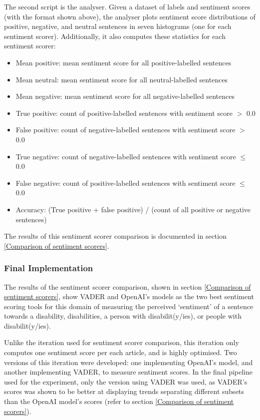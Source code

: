 \documentclass{report}
\begin{document}
The second script is the analyser.
Given a dataset of labels and sentiment scores (with the format shown above), the analyser plots sentiment score distributions of positive, negative, and neutral sentences in seven histograms (one for each sentiment scorer).
Additionally, it also computes these statistics for each sentiment scorer:
\begin{itemize}
	\item Mean positive: mean sentiment score for all positive-labelled sentences
	\item Mean neutral: mean sentiment score for all neutral-labelled sentences
	\item Mean negative: mean sentiment score for all negative-labelled sentences
	\item True positive: count of positive-labelled sentences with sentiment score $>$ 0.0
	\item False positive: count of negative-labelled sentences with sentiment score $>$ 0.0 
	\item True negative: count of negative-labelled sentences with sentiment score $\le$ 0.0
	\item False negative: count of positive-labelled sentences with sentiment score $\le$ 0.0
	\item Accuracy: (True positive + false positive) / (count of all positive or negative sentences)
\end{itemize}
The results of this sentiment scorer comparison is documented in section \ref{Comparison of sentiment scorers}.

\subsubsection{Final Implementation} \label{des-sentiment-final}

The results of the sentiment scorer comparison, shown in section \ref{Comparison of sentiment scorers}, show VADER \cite{VADER} and OpenAI's \cite{OpenAI} models as the two best sentiment scoring tools for this domain of measuring the perceived `sentiment' of a sentence towards a disability, disabilities, a person with disabilit(y/ies), or people with disabilit(y/ies).

Unlike the iteration used for sentiment scorer comparison, this iteration only computes one sentiment score per each article, and is highly optimised.
Two versions of this iteration were developed: one implementing OpenAI's model, and another implementing VADER, to measure sentiment scores.
In the final pipeline used for the experiment, only the version using VADER was used, as VADER's scores was shown to be better at displaying trends separating different subsets than the OpenAI model's scores (refer to section \ref{Comparison of sentiment scorers}).
\end{document}
